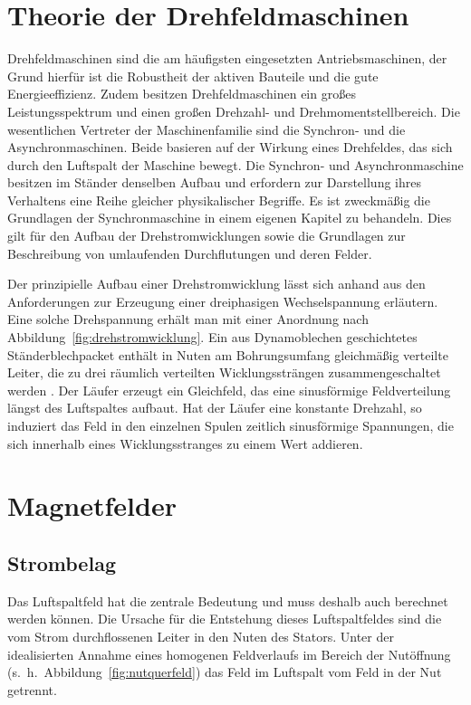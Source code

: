 \section{Theorie der Drehfeldmaschinen}\label{sec:grund-drehfeld}

Drehfeldmaschinen sind die am häufigsten eingesetzten Antriebsmaschinen, der Grund hierfür ist die Robustheit der aktiven Bauteile und die gute Energieeffizienz.
Zudem besitzen Drehfeldmaschinen ein großes Leistungsspektrum und einen großen Drehzahl- und Drehmomentstellbereich.
Die wesentlichen Vertreter der Maschinenfamilie sind die Synchron- und die Asynchronmaschinen.
Beide basieren auf der Wirkung eines Drehfeldes, das sich durch den Luftspalt der Maschine bewegt.
Die Synchron- und Asynchronmaschine besitzen im Ständer denselben Aufbau und erfordern zur Darstellung ihres Verhaltens eine Reihe gleicher physikalischer Begriffe.
Es ist zweckmäßig die Grundlagen der Synchronmaschine in einem eigenen Kapitel zu behandeln.
Dies gilt \insb für den Aufbau der Drehstromwicklungen sowie die Grundlagen zur Beschreibung von umlaufenden Durchflutungen und deren Felder.

Der prinzipielle Aufbau einer Drehstromwicklung lässt sich anhand aus den Anforderungen zur Erzeugung einer dreiphasigen Wechselspannung erläutern.
Eine solche Drehspannung erhält man mit einer Anordnung nach Abbildung~\ref{fig:drehstromwicklung}.
Ein aus Dynamoblechen geschichtetes Ständerblechpacket enthält in Nuten am Bohrungsumfang gleichmäßig verteilte Leiter, die zu drei räumlich verteilten Wicklungssträngen zusammengeschaltet werden \autocite[S.~141]{fischer2009}.
Der Läufer erzeugt ein Gleichfeld, das eine sinusförmige Feldverteilung längst des Luftspaltes aufbaut.
Hat der Läufer eine konstante Drehzahl, so induziert das Feld in den einzelnen Spulen zeitlich sinusförmige Spannungen, die sich innerhalb eines Wicklungsstranges zu einem Wert addieren.

\section{Magnetfelder}

\subsection{Strombelag}

Das Luftspaltfeld hat die zentrale Bedeutung und muss deshalb auch berechnet werden können.
Die Ursache für die Entstehung dieses Luftspaltfeldes sind die vom Strom durchflossenen Leiter in den Nuten des Stators.
Unter der idealisierten Annahme eines homogenen Feldverlaufs im Bereich der Nutöffnung (s.~h.~Abbildung~\ref{fig:nutquerfeld}) das Feld im Luftspalt vom Feld in der Nut getrennt.

